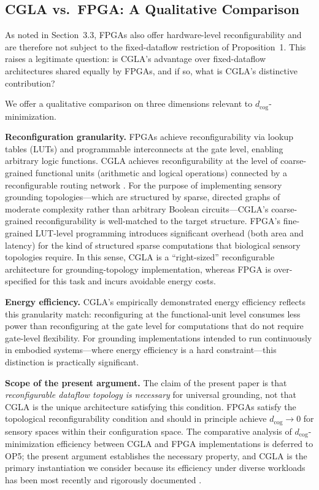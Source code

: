\documentclass[12pt]{article}
\begin{document}
\subsection{CGLA vs.\ FPGA: A Qualitative Comparison}

As noted in Section~3.3, FPGAs also offer hardware-level
reconfigurability and are therefore not subject to the fixed-dataflow
restriction of Proposition~1. This raises a legitimate question: is
CGLA's advantage over fixed-dataflow architectures shared equally by
FPGAs, and if so, what is CGLA's distinctive contribution?

We offer a qualitative comparison on three dimensions relevant to
$d_{\mathrm{cog}}$-minimization.

\textbf{Reconfiguration granularity.} FPGAs achieve reconfigurability
via lookup tables (LUTs) and programmable interconnects at the
gate level, enabling arbitrary logic functions. CGLA achieves
reconfigurability at the level of coarse-grained functional units
(arithmetic and logical operations) connected by a reconfigurable
routing network \cite{akabe2025}. For the purpose of implementing
sensory grounding topologies---which are structured by sparse,
directed graphs of moderate complexity rather than arbitrary Boolean
circuits---CGLA's coarse-grained reconfigurability is well-matched
to the target structure. FPGA's fine-grained LUT-level programming
introduces significant overhead (both area and latency) for the
kind of structured sparse computations that biological sensory
topologies require. In this sense, CGLA is a ``right-sized''
reconfigurable architecture for grounding-topology implementation,
whereas FPGA is over-specified for this task and incurs avoidable
energy costs.

\textbf{Energy efficiency.} CGLA's empirically demonstrated energy
efficiency \cite{akabe2025, ando2025_whisper} reflects this
granularity match: reconfiguring at the functional-unit level
consumes less power than reconfiguring at the gate level for
computations that do not require gate-level flexibility. For
grounding implementations intended to run continuously in embodied
systems---where energy efficiency is a hard constraint---this
distinction is practically significant.

\textbf{Scope of the present argument.} The claim of the present
paper is that \emph{reconfigurable dataflow topology is necessary}
for universal grounding, not that CGLA is the unique architecture
satisfying this condition. FPGAs satisfy the topological
reconfigurability condition and should in principle achieve
$d_{\mathrm{cog}} \to 0$ for sensory spaces within their
configuration space. The comparative analysis of
$d_{\mathrm{cog}}$-minimization efficiency between CGLA and FPGA
implementations is deferred to OP5; the present argument establishes
the necessary property, and CGLA is the primary instantiation we
consider because its efficiency under diverse workloads has been most
recently and rigorously documented \cite{akabe2025, ando2025_whisper}.
\end{document}
